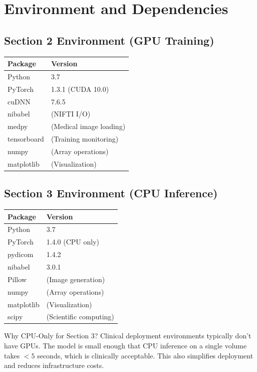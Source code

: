 \documentclass[12pt,a4paper]{report}
\begin{document}
\chapter{Environment and Dependencies}

\section{Section 2 Environment (GPU Training)}

\begin{table}[H]
\centering
\begin{tabular}{ll}
\toprule
\textbf{Package} & \textbf{Version} \\
\midrule
Python & 3.7 \\
PyTorch & 1.3.1 (CUDA 10.0) \\
cuDNN & 7.6.5 \\
nibabel & (NIFTI I/O) \\
medpy & (Medical image loading) \\
tensorboard & (Training monitoring) \\
numpy & (Array operations) \\
matplotlib & (Visualization) \\
\bottomrule
\end{tabular}
\end{table}

\section{Section 3 Environment (CPU Inference)}

\begin{table}[H]
\centering
\begin{tabular}{ll}
\toprule
\textbf{Package} & \textbf{Version} \\
\midrule
Python & 3.7 \\
PyTorch & 1.4.0 (CPU only) \\
pydicom & 1.4.2 \\
nibabel & 3.0.1 \\
Pillow & (Image generation) \\
numpy & (Array operations) \\
matplotlib & (Visualization) \\
scipy & (Scientific computing) \\
\bottomrule
\end{tabular}
\end{table}

\begin{infobox}{Why CPU-Only for Section 3?}
Clinical deployment environments typically don't have GPUs. The model is small enough that CPU inference on a single volume takes $<5$ seconds, which is clinically acceptable. This also simplifies deployment and reduces infrastructure costs.
\end{infobox}
\end{document}
